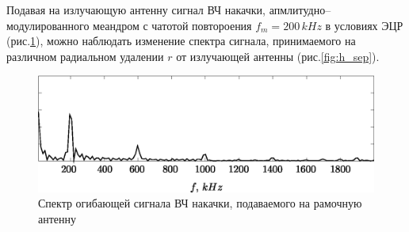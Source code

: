 \documentclass[autoref,10pt]{disser}
\begin{document}
Подавая на излучающую антенну сигнал ВЧ накачки, апмлитудно--мо\-ду\-ли\-ро\-ван\-ного меандром с чатотой повтороения $f_m=200\,kHz$ в условиях ЭЦР (\mbox{рис.\ref{fig:h_sep_base}}), можно наблюдать изменение спектра сигнала, принимаемого на различном радиальном удалении $r$ от излучающей антенны (\mbox{рис.\ref{fig:h_sep}}).
\begin{figure}[H]
    \centering
    \includegraphics*[width=0.8\columnwidth]{pics/h_separation_base}
    \caption{Спектр огибающей сигнала ВЧ накачки, подаваемого на рамочную антенну}
    \label{fig:h_sep_base}
 \end{figure}

\begin{figure}
   \flushright
   \def\svgwidth{0.75\columnwidth} %
   
\end{figure}
\end{document}
